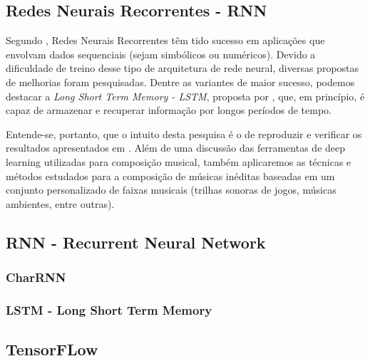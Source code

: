 \documentclass{automatextcc}
\begin{document}
\subsection{Redes Neurais Recorrentes - RNN}
Segundo \cite{karpathy2015visualizing}, Redes Neurais Recorrentes têm tido sucesso em aplicações que envolvam dados sequenciais (sejam simbólicos ou numéricos). Devido a dificuldade de treino desse tipo de arquitetura de rede neural, diversas propostas de melhorias foram pesquisadas. Dentre as variantes de maior sucesso, podemos destacar a \textit{Long Short Term Memory - LSTM}, proposta por \cite{lstm1997}, que, em princípio, é capaz de armazenar e recuperar informação por longos períodos de tempo.

Entende-se, portanto, que o intuito desta pesquisa é o de reproduzir e verificar os resultados apresentados em \cite{agarwala2017music}. Além de uma discussão das ferramentas de deep learning utilizadas para composição musical, também aplicaremos as técnicas e métodos estudados para a composição de músicas inéditas baseadas em um conjunto personalizado de faixas musicais (trilhas sonoras de jogos, músicas ambientes, entre outras).

\subsection{RNN - Recurrent Neural Network}



\subsubsection{CharRNN}
\subsubsection{LSTM - Long Short Term Memory}




\subsection{TensorFLow}



\newpage
\end{document}
